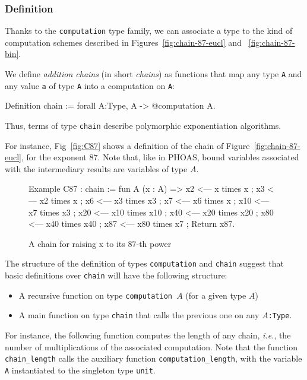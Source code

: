 \subsubsection{Definition}
\label{chain-def}

Thanks to the  \texttt{computation} type family, we can associate a type
to the kind of computation schemes described in Figures~\ref{fig:chain-87-eucl} and ~\ref{fig:chain-87-bin}.

We define 
 \emph{addition chains} (in short  \emph{chains}) as functions that map
 any
 type \texttt{A} and any value \texttt{a} of type \texttt{A}  into a computation 
on \texttt{A}:

\begin{Coqsrc}
Definition chain := forall A:Type, A -> @computation A.   
\end{Coqsrc}

Thus, terms of type \texttt{chain} describe polymorphic 
exponentiation algorithms. 


For instance, Fig~\vref{fig:C87} shows a definition of the chain  of Figure~\ref{fig:chain-87-eucl}, for the exponent $87$.
Note that, like in PHOAS, bound variables associated with the 
intermediary results are \coq{} variables of type $A$.
\begin{figure}[h]
  \centering
  \begin{Coqsrc}
Example  C87 : chain :=
 fun A (x : A) =>
  x2 <--- x times x ;
  x3 <--- x2 times x ;
  x6 <--- x3 times x3 ;
  x7 <--- x6 times x ;
  x10 <--- x7 times x3 ;
  x20 <--- x10 times x10 ;
  x40 <--- x20 times x20 ;
  x80 <--- x40 times x40 ;  
  x87 <--- x80 times x7 ;
  Return x87.
 \end{Coqsrc}
  \caption{A chain for raising x to its $87$-th power}
  \label{fig:C87}
\end{figure}



The structure of the definition of types \texttt{computation}   and \texttt{chain} suggest that basic definitions over \texttt{chain} will have the following structure:
\begin{itemize}
\item A recursive function on type \texttt{computation $A$} (for a given
    type $A$)
\item A main function on type \texttt{chain} that calls the previous one on 
any \texttt{$A$:Type}.
\end{itemize}

For instance, the following function computes the length of any chain,
\emph{i.e.}, the number of multiplications of the associated computation.
Note that the function \texttt{chain\_length} calls the auxiliary function
\texttt{computation\_length}, with the variable \texttt{A} instantiated to the singleton type  \texttt{unit}. 

